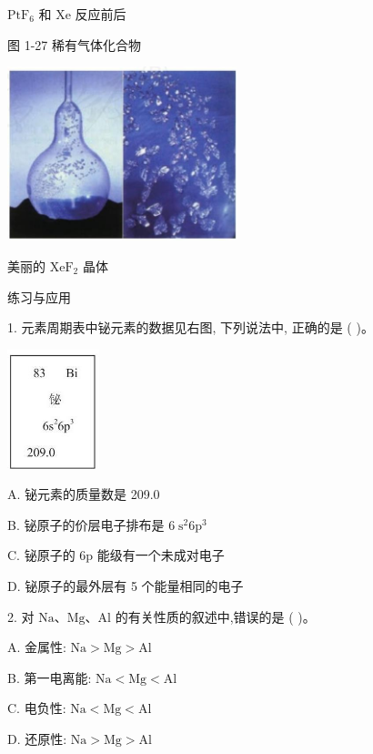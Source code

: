 \documentclass[10pt]{article}
\begin{document}
\({\mathrm{{PtF}}}_{6}\) 和 \(\mathrm{{Xe}}\) 反应前后

图 1-27 稀有气体化合物

\begin{center}
\includegraphics[max width=0.5\textwidth]{images/0190e026-5a11-7df7-bd27-54d09026ba7a_30_792911.jpg}
\end{center}

美丽的 \({\mathrm{{XeF}}}_{2}\) 晶体

练习与应用

1. 元素周期表中铋元素的数据见右图, 下列说法中, 正确的是 ( )。

\begin{center}
\includegraphics[max width=0.2\textwidth]{images/0190e026-5a11-7df7-bd27-54d09026ba7a_31_565874.jpg}
\end{center}

A. 铋元素的质量数是 209.0

B. 铋原子的价层电子排布是 \(6{\mathrm{\;s}}^{2}6{\mathrm{p}}^{3}\)

C. 铋原子的 \(6\mathrm{p}\) 能级有一个未成对电子

D. 铋原子的最外层有 5 个能量相同的电子

2. 对 \(\mathrm{{Na}}\text{、}\mathrm{{Mg}}\text{、}\mathrm{{Al}}\) 的有关性质的叙述中,错误的是 ( )。

A. 金属性: \(\mathrm{{Na}} > \mathrm{{Mg}} > \mathrm{{Al}}\)

B. 第一电离能: \(\mathrm{{Na}} < \mathrm{{Mg}} < \mathrm{{Al}}\)

C. 电负性: \(\mathrm{{Na}} < \mathrm{{Mg}} < \mathrm{{Al}}\)

D. 还原性: \(\mathrm{{Na}} > \mathrm{{Mg}} > \mathrm{{Al}}\)
\end{document}
